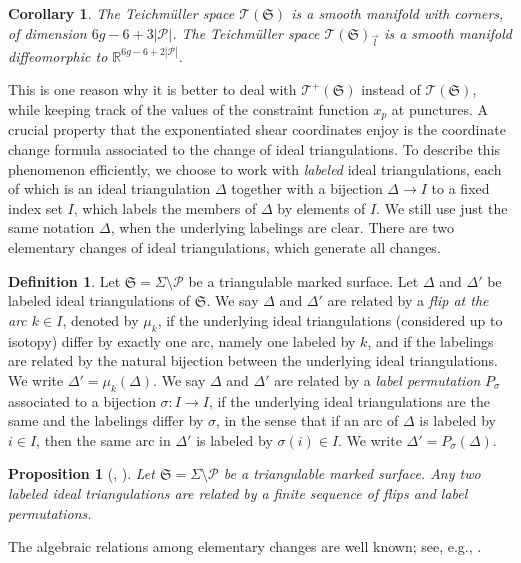 \documentclass[10pt,a4paper]{amsart}
\numberwithin{equation}{section}
\newtheorem{Corollary}[Theorem]{Corollary}
\newtheorem{Proposition}[Theorem]{Proposition}
\theoremstyle{definition}
\newtheorem{Definition}[Theorem]{Definition}
\begin{document}
\begin{Corollary}\label{cor:with_corners}
The Teichm\"uller space $\mathscr{T}(\mathfrak{S})$ is a smooth manifold with corners, of dimension $6g-6+3|\mathcal{P}|$.
The Teichm\"uller space $\mathscr{T}(\mathfrak{S})_{\vec{l}}$ is a smooth manifold diffeomorphic to $\mathbb{R}^{6g-6+2|\mathcal{P}|}$.
\end{Corollary}
This is one reason why it is better to deal with $\mathscr{T}^+(\mathfrak{S})$ instead of $\mathscr{T}(\mathfrak{S})$, while keeping track of the values of the constraint function $x_p$ at punctures.
A crucial property that the exponentiated shear coordinates enjoy is the coordinate change formula associated to the change of ideal triangulations. To describe this phenomenon efficiently, we choose to work with {\em labeled} ideal triangulations, each of which is an ideal triangulation $\Delta$ together with a bijection $\Delta \to I$ to a fixed index set $I$, which labels the members of $\Delta$ by elements of $I$. We still use just the same notation $\Delta$, when the underlying labelings are clear. There are two elementary changes of ideal triangulations, which generate all changes.
\begin{Definition}
Let $\mathfrak{S}= \Sigma\setminus \mathcal{P}$ be a triangulable marked surface. Let $\Delta$ and $\Delta'$ be labeled ideal triangulations of $\mathfrak{S}$.
We say $\Delta$ and $\Delta'$ are related by a {\em flip at the arc $k \in I$}, denoted by $\mu_k$, if the underlying ideal triangulations (considered up to isotopy) differ by exactly one arc, namely one labeled by $k$, and if the labelings are related by the natural bijection between the underlying ideal triangulations. We write $\Delta' = \mu_k(\Delta)$.
We say $\Delta$ and $\Delta'$ are related by a {\em label permutation} $P_\sigma$ associated to a bijection $\sigma \colon I \to I$, if the underlying ideal triangulations are the same and the labelings differ by $\sigma$, in the sense that if an arc of $\Delta$ is labeled by $i\in I$, then the same arc in $\Delta'$ is labeled by $\sigma(i)\in I$. We write $\Delta' = P_\sigma(\Delta)$.
\end{Definition}
\begin{Proposition}[{\cite[Fact 1.24]{P12}}, \cite{Thurston79}]
Let $\mathfrak{S} = \Sigma\setminus \mathcal{P}$ be a triangulable marked surface. Any two labeled ideal triangulations are related by a finite sequence of flips and label permutations.
\end{Proposition}
The algebraic relations among elementary changes are well known; see, e.g., \cite{FST, Kim_ratio}.
\end{document}
